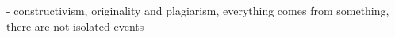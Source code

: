 












- constructivism, originality and plagiarism, everything comes from something, there are not isolated events




